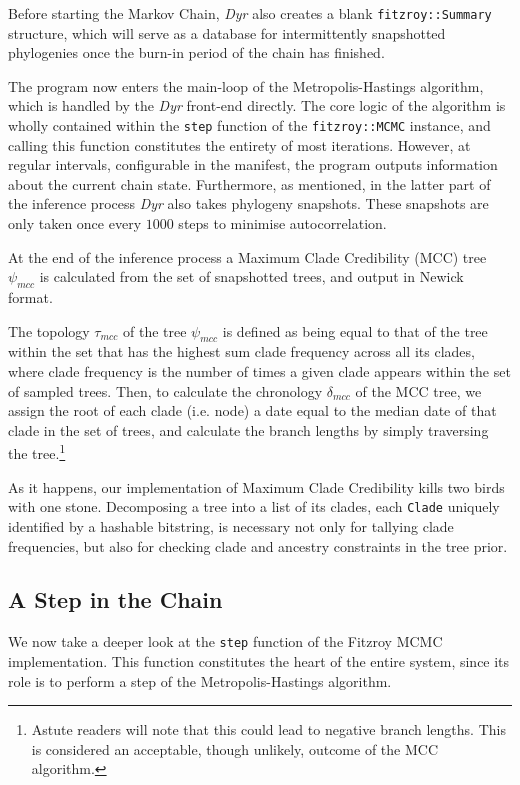 \documentclass[10pt,journal,compsoc]{IEEEtran}
\begin{document}
Before starting the Markov Chain, \textit{Dyr} also creates a blank \texttt{fitzroy::Summary} structure, which will serve as a database for intermittently snapshotted phylogenies once the burn-in period of the chain has finished. 

The program now enters the main-loop of the Metropolis-Hastings algorithm, which is handled by the  \textit{Dyr} front-end directly. The core logic of the algorithm is wholly contained within the \texttt{step} function of the \texttt{fitzroy::MCMC} instance, and calling this function constitutes the entirety of most iterations. However, at regular intervals, configurable in the manifest, the program outputs information about the current chain state. Furthermore, as mentioned, in the latter part of the inference process \textit{Dyr} also takes phylogeny snapshots. These snapshots are only taken once every $1000$ steps to minimise autocorrelation.

At the end of the inference process a Maximum Clade Credibility (MCC) tree $\psi_{mcc}$ is calculated from the set of snapshotted trees, and output in Newick format.

The topology $\tau_{mcc}$ of the tree $\psi_{mcc}$ is defined as being equal to that of the tree within the set that has the highest sum clade frequency across all its clades, where clade frequency is the number of times a given clade appears within the set of sampled trees. Then, to calculate the chronology $\delta_{mcc}$ of the MCC tree, we assign the root of each clade (i.e. node) a date equal to the median date of that clade in the set of trees, and calculate the branch lengths by simply traversing the tree\cite{heled2013looking}.\footnote{Astute readers will note that this could lead to negative branch lengths. This is considered an acceptable, though unlikely, outcome of the MCC algorithm.}

As it happens, our implementation of Maximum Clade Credibility kills two birds with one stone. Decomposing a tree into a list of its clades, each \texttt{Clade} uniquely identified by a hashable bitstring, is necessary not only for tallying clade frequencies, but also for checking clade and ancestry constraints in the tree prior.

\subsection{A Step in the Chain}

We now take a deeper look at the \texttt{step} function of the Fitzroy MCMC implementation. This function constitutes the heart of the entire system, since its role is to perform a step of the Metropolis-Hastings algorithm.
\end{document}
